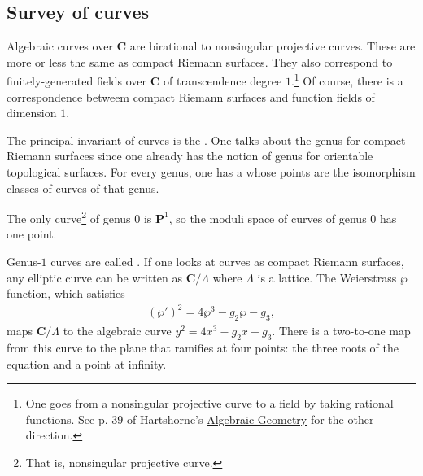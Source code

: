 \documentclass [11 pt, oneside, margin = 1 in] {article}
\begin{document}
\subsection{Survey of curves}
Algebraic curves over $\mathbf{C}$ are birational to nonsingular projective curves. These are more or less the same as compact Riemann surfaces. They also correspond to finitely-generated fields over $\mathbf{C}$ of transcendence degree $1$.\footnote{One goes from a nonsingular projective curve to a field by taking rational functions. See p. 39 of Hartshorne's \underline{Algebraic Geometry} for the other direction.} Of course, there is a correspondence betweem compact Riemann surfaces and function fields of dimension $1$.

The principal invariant of curves is the . One talks about the genus for compact Riemann surfaces since one already has the notion of genus for orientable topological surfaces. For every genus, one has a  whose points are the isomorphism classes of curves of that genus.

The only curve\footnote{That is, nonsingular projective curve.} of genus $0$ is $\mathbf{P}^1$, so the moduli space of curves of genus $0$ has one point.

Genus-$1$ curves are called . If one looks at curves as compact Riemann surfaces, any elliptic curve can be written as $\mathbf{C}/\Lambda$ where $\Lambda$ is a lattice. The Weierstrass $\wp$ function, which satisfies
\begin{align*}
	(\wp') ^2 = 4\wp^3 -g_2\wp-g_3,
\end{align*}
maps $\mathbf{C}/\Lambda$ to the algebraic curve $y^2=4x^3-g_2x-g_3$. There is a two-to-one map from this curve to the plane that ramifies at four points: the three roots of the equation and a point at infinity.
\end{document}
